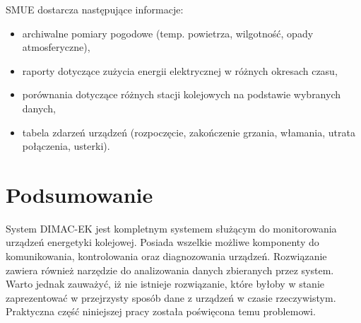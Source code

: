 SMUE dostarcza następujące informacje:
\begin{itemize}
\item archiwalne pomiary pogodowe (temp. powietrza, wilgotność, opady atmosferyczne),
\item raporty dotyczące zużycia energii elektrycznej w różnych okresach czasu,
\item porównania dotyczące różnych stacji kolejowych na podstawie wybranych danych,
\item tabela zdarzeń urządzeń (rozpoczęcie, zakończenie grzania, włamania, utrata połączenia, usterki).
\end{itemize}

\section{Podsumowanie}
System DIMAC-EK jest kompletnym systemem służącym do monitorowania urządzeń energetyki kolejowej. Posiada wszelkie możliwe komponenty do komunikowania, kontrolowania oraz diagnozowania urządzeń. Rozwiązanie zawiera również narzędzie do analizowania danych zbieranych przez system. Warto jednak zauważyć, iż nie istnieje rozwiązanie, które byłoby w stanie zaprezentować w przejrzysty sposób dane z urządzeń w czasie rzeczywistym. Praktyczna część niniejszej pracy została poświęcona temu problemowi.